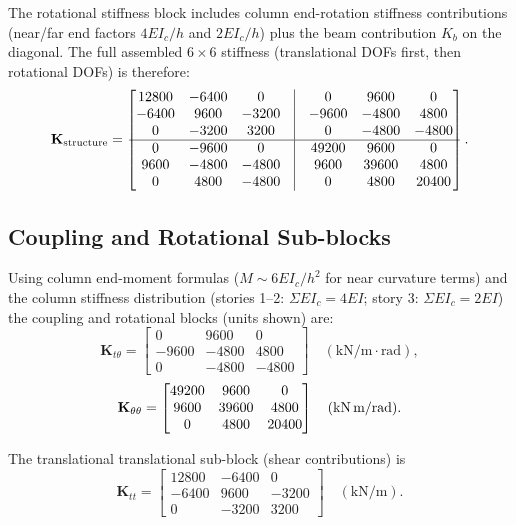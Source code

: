 \documentclass[12pt,a4paper]{article}
\newcommand{\mat}[1]{\mathbf{#1}}
\begin{document}
The rotational stiffness block includes column end-rotation stiffness contributions (near/far end factors $4EI_c/h$ and $2EI_c/h$) plus the beam contribution $K_b$ on the diagonal. The full assembled $6\times6$ stiffness (translational DOFs first, then rotational DOFs) is therefore:
\begin{equation}
  \mat{K}_{\text{structure}} = \begin{bmatrix}
    12800 & -6400 & 0 & \vline & 0 & 9600 & 0 \\
    -6400 & 9600 & -3200 & \vline & -9600 & -4800 & 4800 \\
    0 & -3200 & 3200 & \vline & 0 & -4800 & -4800 \\
    \hline
    0 & -9600 & 0 & \vline & 49200 & 9600 & 0 \\
    9600 & -4800 & -4800 & \vline & 9600 & 39600 & 4800 \\
    0 & 4800 & -4800 & \vline & 0 & 4800 & 20400
  \end{bmatrix}.
\end{equation}

\subsection{Coupling and Rotational Sub-blocks}
Using column end-moment formulas ($M\sim 6EI_c/h^2$ for near curvature terms) and the column stiffness distribution (stories 1--2: $\Sigma EI_c=4EI$; story 3: $\Sigma EI_c=2EI$) the coupling and rotational blocks (units shown) are:
\begin{equation}
  \mat{K}_{t\theta} = \begin{bmatrix}0 & 9600 & 0\\-9600 & -4800 & 4800\\0 & -4800 & -4800\end{bmatrix}\quad(\text{kN/m}\cdot\text{rad}),
\end{equation}
\begin{equation}
  \mat{K}_{\theta\theta} = \begin{bmatrix}49200 & 9600 & 0\\9600 & 39600 & 4800\\0 & 4800 & 20400\end{bmatrix}\quad(\text{kN\,m/rad}).
\end{equation}

The translational translational sub-block (shear contributions) is
\begin{equation}
  \mat{K}_{tt} = \begin{bmatrix}12800 & -6400 & 0\\-6400 & 9600 & -3200\\0 & -3200 & 3200\end{bmatrix}\quad(\text{kN/m}).
\end{equation}
\end{document}
